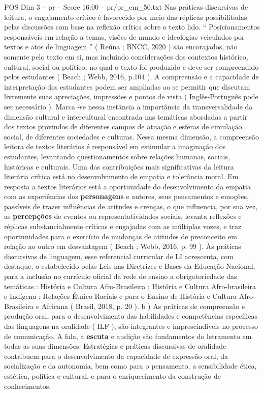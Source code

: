 \begin{textsample}{POS Dim 3 – pr – Score 16.00 – pr/pr\_em\_50.txt}
Nas práticas discursivas de leitura, o engajamento crítico é favorecido por meio das réplicas possibilitadas pelas discussões com base na reflexão crítica sobre o texto lido. “ Posicionamentos responsáveis em relação a temas, visões de mundo e ideologias veiculados por textos e atos de linguagem ” ( Reúna ; BNCC, 2020 ) são encorajados, não somente pelo texto em si, mas incluindo considerações dos contextos histórico, cultural, social ou político, no qual o texto foi produzido e deve ser compreendido pelos estudantes ( Beach ; Webb, 2016, p.104 ).
A compreensão e a capacidade de interpretação dos estudantes podem ser ampliadas ao se permitir que discutam livremente suas apreciações, impressões e pontos de vista ( Inglês-Português pode ser necessário ).
Marca -se nessa instância a importância da transversalidade da dimensão cultural e intercultural encontrada nas temáticas abordadas a partir dos textos provindos de diferentes campos de atuação e esferas de circulação social, de diferentes sociedades e culturas.
Nessa mesma dimensão, a compreensão leitora de textos literários é responsável em estimular a imaginação dos estudantes, levantando questionamentos sobre relações humanas, sociais, históricas e culturais.
Uma das contribuições mais significativas da leitura literária crítica está no desenvolvimento de empatia e tolerância moral.
Em resposta a textos literários está a oportunidade do desenvolvimento da empatia com as experiências dos \textbf{personagens} e autores, seus pensamentos e emoções, passíveis de trazer influências de atitudes e crenças, o que influencia, por sua vez, as \textbf{percepções} de eventos ou representatividades sociais, levanta reflexões e réplicas substancialmente críticas e engajadas com as múltiplas vozes, e traz oportunidades para o exercício de mudanças de atitudes de preconceito em relação ao outro em desvantagem ( Beach ; Webb, 2016, p. 99 ).
Às práticas discursivas de linguagem, esse referencial curricular de LI acrescenta, com destaque, o estabelecido pelas Leis nas Diretrizes e Bases da Educação Nacional, para a inclusão no currículo oficial da rede de ensino a obrigatoriedade das temáticas : História e Cultura Afro-Brasileira ; História e Cultura Afro-brasileira e Indígena ; Relações Étnico-Raciais e para o Ensino de História e Cultura Afro-Brasileira e Africana ( Brasil, 2018, p. 20 ). b ) As práticas de compreensão e produção oral, para o desenvolvimento das habilidades e competências específicas das linguagens na oralidade ( ILF ), são integrantes e imprescindíveis no processo de comunicação.
A fala, a \textbf{escuta} e audição são fundamentos do letramento em todas as suas dimensões.
Estratégias e práticas discursivas de oralidade contribuem para o desenvolvimento da capacidade de expressão oral, da socialização e da autonomia, bem como para o pensamento, a sensibilidade ética, estética, política e cultural, e para o enriquecimento da construção de conhecimentos.

\end{textsample}
